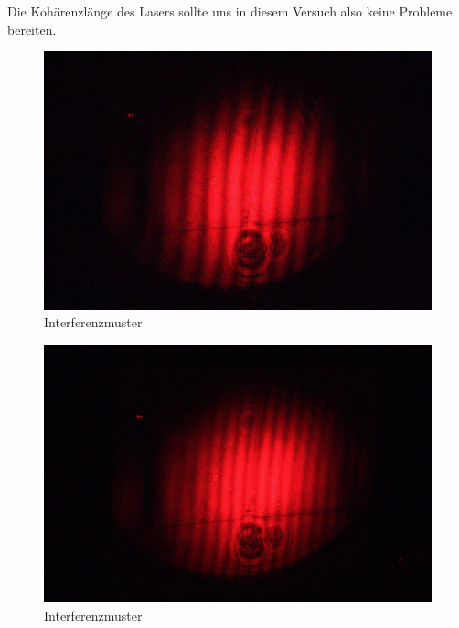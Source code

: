 Die Kohärenzlänge des Lasers sollte uns in diesem Versuch also keine Probleme bereiten. 

 
\begin{figure}[H]
 \includegraphics[width=\textwidth]{Photos/IMG_3881.jpg}
 \caption{Interferenzmuster}
 \label{michelson_interferenzmuster}
\end{figure}


\begin{figure}[H]
 \includegraphics[width=\textwidth]{Photos/IMG_3887.jpg}
 \caption{Interferenzmuster}
\end{figure}